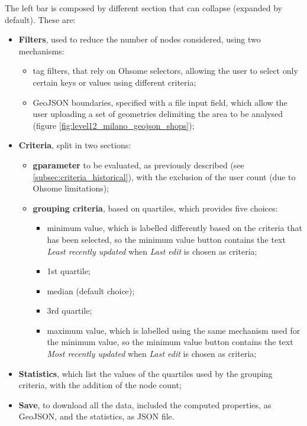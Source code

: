\documentclass{Configuration_Files/PoliMi3i_thesis}
\begin{document}
The left bar is composed by different section that can collapse (expanded by default). These are:

\begin{itemize}
    \item \textbf{Filters}, used to reduce the number of nodes considered, using two mechanisms:
    \begin{itemize}
        \item tag filters, that rely on Ohsome selectors, allowing the user to select only certain keys or values using different criteria;
        \item GeoJSON boundaries, specified with a file input field, which allow the user uploading a set of geometries delimiting the area to be analysed (figure \ref{fig:level12_milano_geojson_shops});
    \end{itemize}
    \item \textbf{Criteria}, split in two sections:
    \begin{itemize}
        \item \textbf{gparameter} to be evaluated, as previously described (see \ref{subsec:criteria_historical}), with the exclusion of the user count (due to Ohsome limitations);
        \item \textbf{grouping criteria}, based on quartiles, which provides five choices:
        \begin{itemize}
            \item minimum value, which is labelled differently based on the criteria that has been selected, so the minimum value button contains the text \textit{Least recently updated} when \textit{Last edit} is chosen as criteria;
            \item 1st quartile;
            \item median (default choice);
            \item 3rd quartile;
            \item maximum value, which is labelled using the same mechanism used for the minimum value, so the minimum value button contains the text \textit{Most recently updated} when \textit{Last edit} is chosen as criteria;
        \end{itemize}
    \end{itemize}
    \item \textbf{Statistics}, which list the values of the quartiles used by the grouping criteria, with the addition of the node count;
    \item \textbf{Save}, to download all the data, included the computed properties, as GeoJSON, and the statistics, as JSON file.
\end{itemize}
\end{document}
